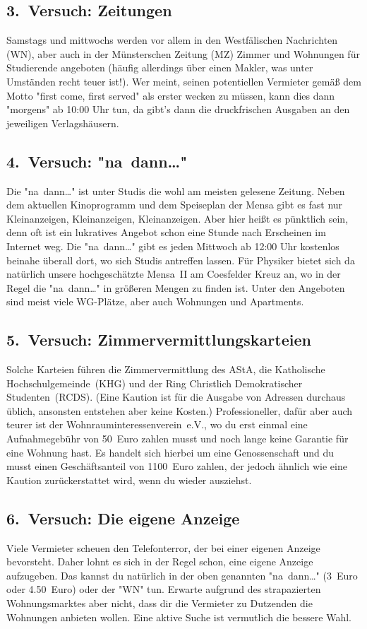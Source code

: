 \begin{multicols*}{2}
\subsection*{3.\ Versuch: Zeitungen}
Samstags und mittwochs werden vor allem in den Westfälischen Nachrichten (WN), aber auch in der Münsterschen Zeitung (MZ) Zimmer und Wohnungen für Studierende angeboten (häufig allerdings über einen Makler, was unter Umständen recht teuer ist!). Wer meint, seinen potentiellen Vermieter gemäß dem Motto "first come, first served" als erster wecken zu müssen, kann dies dann "morgens" ab 10:00 Uhr tun, da gibt's dann die druckfrischen Ausgaben an den jeweiligen Verlagshäusern.

\subsection*{4.\ Versuch: "na~dann\dots"}
Die "na~dann\dots" ist unter Studis die wohl am meisten gelesene Zeitung. Neben dem aktuellen Kinoprogramm und dem Speiseplan der Mensa gibt es fast nur Kleinanzeigen, Kleinanzeigen, Kleinanzeigen. Aber hier heißt es pünktlich sein, denn oft ist ein lukratives Angebot schon eine Stunde nach Erscheinen im Internet weg. Die "na~dann\dots" gibt es jeden Mittwoch ab 12:00 Uhr kostenlos beinahe überall dort, wo sich Studis antreffen lassen. Für Physiker bietet sich da natürlich unsere hochgeschätzte Mensa~II am Coesfelder Kreuz an, wo in der Regel die "na~dann\dots" in größeren Mengen zu finden ist. Unter den Angeboten sind meist viele WG-Plätze, aber auch Wohnungen und Apartments.

\subsection*{5.\ Versuch: Zimmervermittlungskarteien}
Solche Karteien führen die Zimmervermittlung des AStA, die Katholische Hochschulgemeinde~(KHG) und der Ring Christlich Demokratischer Studenten~(RCDS). (Eine Kaution ist für die Ausgabe von Adressen durchaus üblich, ansonsten entstehen aber keine Kosten.) Professioneller, dafür aber auch teurer ist der Wohnrauminteressenverein~e.V., wo du erst einmal eine Aufnahmegebühr von 50~Euro zahlen musst und noch lange keine Garantie für eine Wohnung hast. Es handelt sich hierbei um eine Genossenschaft und du musst einen Geschäftsanteil von 1100~Euro zahlen, der jedoch ähnlich wie eine Kaution zurückerstattet wird, wenn du wieder ausziehst.

\subsection*{6.\ Versuch: Die eigene Anzeige}
Viele Vermieter scheuen den Telefonterror, der bei einer eigenen Anzeige bevorsteht. Daher lohnt es sich in der Regel schon, eine eigene Anzeige aufzugeben. Das kannst du natürlich in der oben genannten "na~dann\dots" (3~Euro oder \num{4,50}~Euro) oder der "WN" tun. Erwarte aufgrund des strapazierten Wohnungsmarktes aber nicht, dass dir die Vermieter zu Dutzenden die Wohnungen anbieten wollen. Eine aktive Suche ist vermutlich die bessere Wahl.


\end{multicols*}
